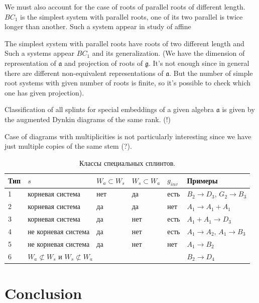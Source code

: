 \documentclass{article}
\newcommand{\gf}{\mathfrak{g}}
\newcommand{\af}{\mathfrak{a}}
\begin{document}
We must also account for the case of roots of parallel roots of different length. $BC_{1} $ is the
simplest system with parallel roots, one of its two parallel is twice longer than another. Such a
system appear in study of affine 


 The simplest
system with parallel roots have roots of two different length and Such a systems
appear  $BC_{1} $ and its generalization. (We have the dimension of representation of $\af$ and
projection of roots of $\gf$. It's not enough since in general there are different non-equivalent
representations of $\af$. But the number of simple root systems with given number of roots is
finite, so it's possible to check which one has given projection).

Classification of all splints for special embeddings of a given algebra $\af$ is given by
the augmented Dynkin diagrams of the same rank. (!)

Case of diagrams with multiplicities is not particularly interesting since we have just multiple
copies of the same stem (?).


\begin{table}[h]
\begin{tabular}[t]{|p{2em}|p{6em}|p{5em}|p{5em}|p{2em}|p{6em}|}
\hline
Тип & $s$ & $W_a\subset W_s$ & $W_s\subset W_a$ & $g_{inv} $ & Примеры \\
\hline
1 & корневая система & нет & да & есть  & $B_2\rightarrow D_3$, $G_2\rightarrow B_3$\\
\hline
2 & корневая система  & да & да & нет & $A_1\rightarrow A_1+A_1$ \\
\hline
3 & корневая система  & да & нет & есть & $A_1+A_1\rightarrow D_3$ \\
\hline
4 & не корневая система  & да & нет & есть & $A_1\rightarrow A_2$, $A_1\rightarrow B_3$\\
\hline
5 & не корневая система  & да & нет & нет  & $A_1\rightarrow B_2$\\
\hline
6 & \multicolumn{4}{|l|}{$W_a\not\subset W_s$ и $W_s\not\subset W_a$} & $B_2\rightarrow D_4$\\
\hline
\end{tabular}
\caption{Классы специальных сплинтов.}
\label {spsp}
\end{table}


\section*{Conclusion}
\label{sec:conclusion}


{} 

\end{document}

